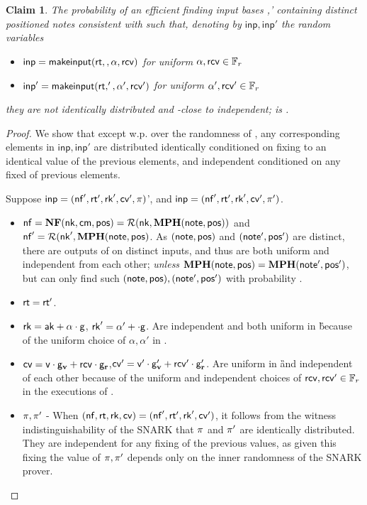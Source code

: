 \documentclass[11pt]{article}
\numberwithin{equation}{section} %
\numberwithin{figure}{section} %
\newtheorem{claim}[thm]{Claim}
\newcommand{\inp}{\ensuremath{\mathsf{inp}}\xspace}
\begin{document}
\begin{claim}\label{clm:inps-areind}
The probability of an efficient \adv finding input bases ,' containing distinct positioned notes consistent with \rt such that, denoting by $\inp,\inp'$ the random variables 
\begin{itemize}
 \item 
$\inp = \makeinput(\rt,,\alpha,\rcv)$ for uniform $\alpha,\mathsf{rcv} \in {\mathbb F}_r$
\item
$\inp' = \makeinput(\rt,',\alpha',\rcv')$ for uniform $\alpha',\mathsf{rcv}' \in {\mathbb F}_r$
\end{itemize}
they are not identically distributed and \negl-close to independent;
is \negl.

\end{claim}																	
\begin{proof}
We show that except w.p. \negl over the randomness of \adv, any corresponding elements in $\inp,\inp'$ are distributed identically conditioned on fixing to an identical value of the previous elements, and independent conditioned on any fixed of previous elements.
 
 Suppose $\inp=(\nf',\rt',\rk',\cv',\prf)$', and $\inp=(\nf',\rt',\rk',\cv',\prf')$.
 \begin{itemize}
  \item  $\mathsf{nf} = \mathbf{NF}(\mathsf{nk},\mathsf{cm},\mathsf{pos})=\mathcal R(\mathsf{nk},\mathbf{MPH}(\mathsf{note},\mathsf{pos}))$ and $\mathsf{nf}'=\mathcal R(\mathsf{nk}',\mathbf{MPH}(\mathsf{note},\mathsf{pos})$. As $(\mathsf{note},\mathsf{pos})$ and $(\mathsf{note}',\mathsf{pos}')$ are distinct, there are outputs of \RO on distinct inputs, and thus are both uniform and independent from each other; \emph{unless} $\mathbf{MPH}(\mathsf{note},\mathsf{pos}) = \mathbf{MPH}(\mathsf{note}',\mathsf{pos}')$, but \adv can only find
  such $(\mathsf{note},\mathsf{pos}),(\mathsf{note}',\mathsf{pos}')$ with probability \negl.
  \item $\mathsf{rt}=\mathsf{rt}'$.
  \item $\mathsf{rk}=\mathsf{ak} + \alpha\cdot \mathsf{g}$, $\mathsf{rk}' = \alpha' + \cdot \mathsf{g}$. Are independent and both uniform in \G because of the uniform choice of $\alpha,\alpha'$ in \makerandomizedtx.
  \item $\mathsf{cv}=\mathsf{v}\cdot \mathsf{g}_{\mathbf{v}} + \mathsf{rcv}\cdot \mathsf{g}_\mathbf{r}$,$\mathsf{cv}'=\mathsf{v}'\cdot \mathsf{g}_{\mathbf{v}}' + \mathsf{rcv}'\cdot \mathsf{g}_\mathbf{r}'$. Are uniform in \G and independent of each other because of the uniform and independent choices of $\mathsf{rcv},\mathsf{rcv}'\in {\mathbb F}_r$ in the executions of \makerandomizedtx.
  \item $\pi,\pi'$ - When  $(\mathsf{nf},\mathsf{rt},\mathsf{rk},\mathsf{cv})=(\mathsf{nf}',\mathsf{rt}',\mathsf{rk}',\mathsf{cv}')$, it follows from the witness indistinguishability of the SNARK
  that $\pi$ and $\pi'$ are identically distributed. They are independent for any fixing of the previous values, as given this fixing the value
  of $\pi,\pi'$ depends only on the inner randomness of the SNARK prover.
 \end{itemize}
 
\end{proof} 
\newcommand{\primeof}[1]{\ensuremath{#1 '}\xspace} 
\newcommand{\beforeout}[1]{\ensuremath{D^{\mathsf{out}}_{<#1}}\xspace}
\newcommand{\beforeoutprime}[1]{\ensuremath{D'^{\mathsf{out}}_{<#1}}\xspace}
\newcommand{\beforein}[1]{\ensuremath{D_{<#1}}\xspace}
\newcommand{\beforeinprime}[1]{\ensuremath{D'_{<#1}}\xspace}
\end{document}
